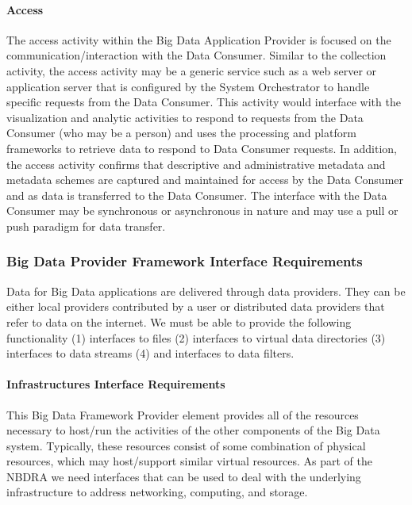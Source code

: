 \documentclass[10pt]{article}
\begin{document}
\paragraph{Access}

The access activity within the Big Data Application Provider is
focused on the communication/interaction with the Data Consumer.
Similar to the collection activity, the access activity may be a
generic service such as a web server or application server that is
configured by the System Orchestrator to handle specific requests from
the Data Consumer. This activity would interface with the
visualization and analytic activities to respond to requests from the
Data Consumer (who may be a person) and uses the processing and
platform frameworks to retrieve data to respond to Data Consumer
requests. In addition, the access activity confirms that descriptive
and administrative metadata and metadata schemes are captured and
maintained for access by the Data Consumer and as data is transferred
to the Data Consumer. The interface with the Data Consumer may be
synchronous or asynchronous in nature and may use a pull or push
paradigm for data transfer.

\subsubsection{Big Data Provider Framework Interface Requirements}\label{S:r-provider-interface}

Data for Big Data applications are delivered through data providers.
They can be either local providers contributed by a user or
distributed data providers that refer to data on the internet. We must
be able to provide the following functionality (1) interfaces to files
(2) interfaces to virtual data directories (3) interfaces to data
streams (4) and interfaces to data filters.

\paragraph{Infrastructures Interface Requirements}

This Big Data Framework Provider element provides all of the resources
necessary to host/run the activities of the other components of the
Big Data system. Typically, these resources consist of some
combination of physical resources, which may host/support similar
virtual resources. As part of the NBDRA we need interfaces that can be
used to deal with the underlying infrastructure to address networking,
computing, and storage.
\end{document}
